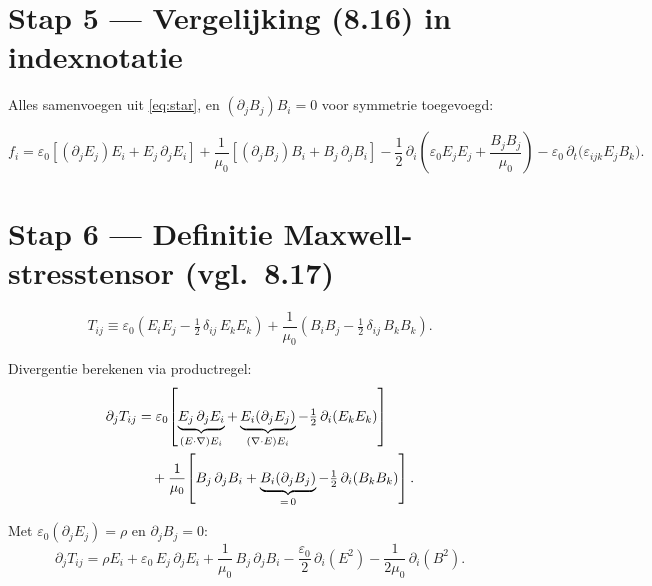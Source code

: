\documentclass[12pt,a4paper]{article}
\begin{document}
\section*{Stap 5 — Vergelijking (8.16) in indexnotatie}

Alles samenvoegen uit \eqref{eq:star}, en $(\partial_j B_j)B_i = 0$ voor symmetrie toegevoegd:

\begin{equation}\label{eq:816}
\boxed{
    f_i = \varepsilon_0\!\left[(\partial_j E_j)E_i + E_j\,\partial_j E_i\right]
        + \frac{1}{\mu_0}\!\left[(\partial_j B_j)B_i + B_j\,\partial_j B_i\right]
        - \frac{1}{2}\,\partial_i\!\left(\varepsilon_0 E_j E_j + \frac{B_j B_j}{\mu_0}\right)
        - \varepsilon_0\,\partial_t\!\bigl(\varepsilon_{ijk}E_j B_k\bigr).
}
\end{equation}

\section*{Stap 6 — Definitie Maxwell-stresstensor (vgl.\ 8.17)}

\begin{equation}
    T_{ij} \equiv \varepsilon_0\!\left(E_i E_j - \tfrac{1}{2}\,\delta_{ij}\,E_k E_k\right)
                + \frac{1}{\mu_0}\!\left(B_i B_j - \tfrac{1}{2}\,\delta_{ij}\,B_k B_k\right).
\end{equation}

Divergentie berekenen via productregel:
\begin{align}
    \partial_j T_{ij}
    &= \varepsilon_0\!\left[
            \underbrace{E_j\,\partial_j E_i}_{(E\cdot\nabla)E_i}
          + \underbrace{E_i(\partial_j E_j)}_{(\nabla\cdot E)E_i}
          - \tfrac{1}{2}\,\partial_i(E_k E_k)
       \right] \notag\\
    &\quad + \frac{1}{\mu_0}\!\left[
            B_j\,\partial_j B_i
          + \underbrace{B_i(\partial_j B_j)}_{=\,0}
          - \tfrac{1}{2}\,\partial_i(B_k B_k)
       \right].
\end{align}

Met $\varepsilon_0(\partial_j E_j) = \rho$ en $\partial_j B_j = 0$:
\begin{equation}
    \partial_j T_{ij}
    = \rho E_i
    + \varepsilon_0\,E_j\,\partial_j E_i
    + \frac{1}{\mu_0}\,B_j\,\partial_j B_i
    - \frac{\varepsilon_0}{2}\,\partial_i(E^2)
    - \frac{1}{2\mu_0}\,\partial_i(B^2).
\end{equation}
\end{document}
